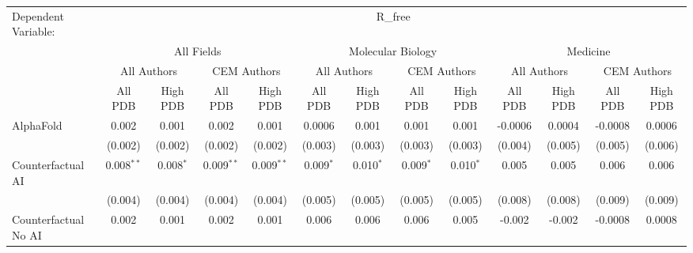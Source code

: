 \begingroup
\centering
\begin{tabular}{lcccccccccccc}
   \tabularnewline \midrule \midrule
   Dependent Variable: & \multicolumn{12}{c}{R\_free}\\
 & \multicolumn{4}{c}{All Fields} & \multicolumn{4}{c}{Molecular Biology} & \multicolumn{4}{c}{Medicine} \\
\cmidrule(lr){2-5} \cmidrule(lr){6-9} \cmidrule(lr){10-13}
 & \multicolumn{2}{c}{All Authors} & \multicolumn{2}{c}{CEM Authors} & \multicolumn{2}{c}{All Authors} & \multicolumn{2}{c}{CEM Authors} & \multicolumn{2}{c}{All Authors} & \multicolumn{2}{c}{CEM Authors} \\
\cmidrule(lr){2-3} \cmidrule(lr){4-5} \cmidrule(lr){6-7} \cmidrule(lr){8-9} \cmidrule(lr){10-11} \cmidrule(lr){12-13}
 & \multicolumn{1}{c}{All PDB} & \multicolumn{1}{c}{High PDB} & \multicolumn{1}{c}{All PDB} & \multicolumn{1}{c}{High PDB} & \multicolumn{1}{c}{All PDB} & \multicolumn{1}{c}{High PDB} & \multicolumn{1}{c}{All PDB} & \multicolumn{1}{c}{High PDB} & \multicolumn{1}{c}{All PDB} & \multicolumn{1}{c}{High PDB} & \multicolumn{1}{c}{All PDB} & \multicolumn{1}{c}{High PDB} \\
\cmidrule(lr){2-2} \cmidrule(lr){3-3} \cmidrule(lr){4-4} \cmidrule(lr){5-5} \cmidrule(lr){6-6} \cmidrule(lr){7-7} \cmidrule(lr){8-8} \cmidrule(lr){9-9} \cmidrule(lr){10-10} \cmidrule(lr){11-11} \cmidrule(lr){12-12} \cmidrule(lr){13-13}
   AlphaFold                                                  & 0.002        & 0.001       & 0.002        & 0.001        & 0.0006       & 0.001          & 0.001        & 0.001        & -0.0006       & 0.0004  & -0.0008  & 0.0006\\   
                                                              & (0.002)      & (0.002)     & (0.002)      & (0.002)      & (0.003)      & (0.003)        & (0.003)      & (0.003)      & (0.004)       & (0.005) & (0.005)  & (0.006)\\   
   Counterfactual AI                                          & 0.008$^{**}$ & 0.008$^{*}$ & 0.009$^{**}$ & 0.009$^{**}$ & 0.009$^{*}$  & 0.010$^{*}$    & 0.009$^{*}$  & 0.010$^{*}$  & 0.005         & 0.005   & 0.006    & 0.006\\   
                                                              & (0.004)      & (0.004)     & (0.004)      & (0.004)      & (0.005)      & (0.005)        & (0.005)      & (0.005)      & (0.008)       & (0.008) & (0.009)  & (0.009)\\   
   Counterfactual No AI                                       & 0.002        & 0.001       & 0.002        & 0.001        & 0.006        & 0.006          & 0.006        & 0.005        & -0.002        & -0.002  & -0.0008  & 0.0008\\   

\end{tabular}
